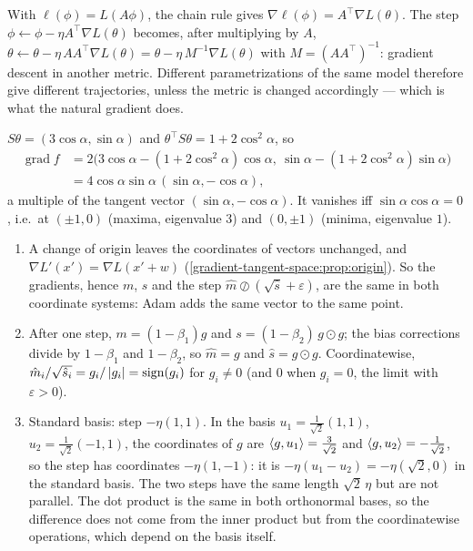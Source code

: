 With $\ell(\phi) = L(A\phi)$, the chain rule gives $\nabla\ell(\phi) = A^\top\nabla L(\theta)$. The step
$\phi\leftarrow\phi - \eta A^\top\nabla L(\theta)$ becomes, after multiplying by $A$,
$\theta\leftarrow\theta - \eta\,AA^\top\nabla L(\theta) = \theta - \eta\,M^{-1}\nabla L(\theta)$ with $M = (AA^\top)^{-1}$: gradient descent in another
metric. Different parametrizations of the same model therefore give different trajectories, unless the
metric is changed accordingly --- which is what the natural gradient does.

$S\theta = (3\cos\alpha, \sin\alpha)$ and $\theta^\top S\theta = 1 + 2\cos^2\alpha$, so
\begin{align*}
  \operatorname{grad}f &= 2\bigl(3\cos\alpha - (1 + 2\cos^2\alpha)\cos\alpha,\ \sin\alpha - (1 + 2\cos^2\alpha)\sin\alpha\bigr)\\
  &= 4\cos\alpha\sin\alpha\,(\sin\alpha, -\cos\alpha),
\end{align*}
a multiple of the tangent vector $(\sin\alpha, -\cos\alpha)$. It vanishes iff $\sin\alpha\cos\alpha = 0$, i.e.\ at $(\pm1, 0)$
(maxima, eigenvalue $3$) and $(0, \pm1)$ (minima, eigenvalue $1$).

\begin{enumerate}[nosep]
  \item A change of origin leaves the coordinates of vectors unchanged, and
        $\nabla L'(x') = \nabla L(x' + w)$ (\cref{gradient-tangent-space:prop:origin}). So the gradients, hence $m$, $s$ and
        the step $\hat m\oslash(\sqrt{\hat s} + \varepsilon)$, are the same in both coordinate systems: Adam adds the same
        vector to the same point.
  \item After one step, $m = (1 - \beta_1)g$ and $s = (1 - \beta_2)\,g\odot g$; the bias corrections divide by
        $1 - \beta_1$ and $1 - \beta_2$, so $\hat m = g$ and $\hat s = g\odot g$. Coordinatewise,
        $\hat m_i/\sqrt{\hat s_i} = g_i/\left|g_i\right| = \mathrm{sign}(g_i)$ for $g_i\neq0$ (and $0$ when $g_i = 0$, the limit with $\varepsilon>0$).
  \item Standard basis: step $-\eta(1, 1)$. In the basis $u_1 = \frac1{\sqrt2}(1,1)$, $u_2 = \frac1{\sqrt2}(-1,1)$, the
        coordinates of $g$ are $\left\langle g, u_1 \right\rangle = \frac3{\sqrt2}$ and $\left\langle g, u_2 \right\rangle = -\frac1{\sqrt2}$, so the step has coordinates
        $-\eta(1, -1)$: it is $-\eta(u_1 - u_2) = -\eta(\sqrt2, 0)$ in the standard basis. The two steps have the
        same length $\sqrt2\,\eta$ but are not parallel. The dot product is the same in both orthonormal bases, so
        the difference does not come from the inner product but from the coordinatewise operations,
        which depend on the basis itself.
\end{enumerate}

